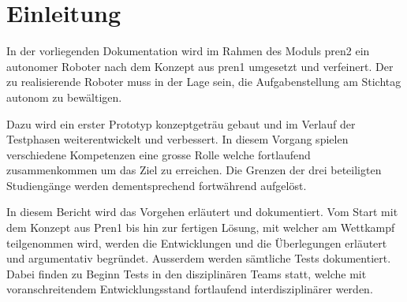 \section{Einleitung}

In der vorliegenden Dokumentation wird im Rahmen des Moduls \acrfull{pren2} ein autonomer Roboter nach dem Konzept aus \acrfull{pren1} umgesetzt und verfeinert. Der zu realisierende Roboter muss in der Lage sein, die Aufgabenstellung am Stichtag autonom zu bewältigen.

Dazu wird ein erster Prototyp konzeptgeträu gebaut und im Verlauf der Testphasen weiterentwickelt und verbessert. In diesem Vorgang spielen verschiedene Kompetenzen eine grosse Rolle welche fortlaufend zusammenkommen um das Ziel zu erreichen. Die Grenzen der drei beteiligten Studiengänge werden dementsprechend fortwährend aufgelöst.

In diesem Bericht wird das Vorgehen erläutert und dokumentiert. Vom Start mit dem Konzept aus Pren1 bis hin zur fertigen Lösung, mit welcher am Wettkampf teilgenommen wird, werden die Entwicklungen und die Überlegungen erläutert und argumentativ begründet. Ausserdem werden sämtliche Tests dokumentiert. Dabei finden zu Beginn Tests in den disziplinären Teams statt, welche mit voranschreitendem Entwicklungsstand fortlaufend interdisziplinärer werden.

